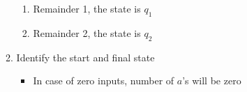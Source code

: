 \documentclass{article}
\newlength{\ansindent}
\begin{document}
\begin{enumerate}[label=\arabic*)]
\begin{enumerate}[label=Step \arabic* :,itemindent=\ansindent]
\begin{enumerate}[label=case \arabic* :]
						\item Remainder 1, the state is $q_1$
						\item Remainder 2, the state is $q_2$
					\end{enumerate}
				\item Identify the start and final state
					\begin{itemize}
						\item In case of zero inputs, number of $a$'s will be zero
					\end{itemize}
			\end{enumerate}
	\end{enumerate}
\end{document}

